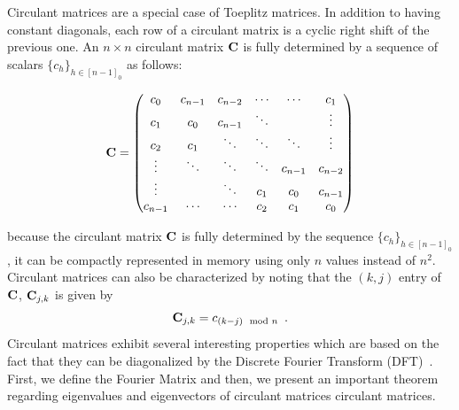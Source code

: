 Circulant matrices are a special case of Toeplitz matrices.
In addition to having constant diagonals, each row of a circulant matrix is a cyclic right shift of the previous one.
An $n \times n$ circulant matrix $\mathbf{C}$ is fully determined by a sequence of scalars $\{c_h\}_{h \in [n-1]_0}$ as follows:

\begin{equation}
  \mathbf{C} =
  \begin{pmatrix}
    c_0 & c_{n-1} & c_{n-2} & \cdots & \cdots & c_{1} \\
    c_{1} & c_0 & c_{n-1} & \ddots & & \vdots \\
    c_{2} & c_{1} & \ddots & \ddots & \ddots & \vdots \\ 
    \vdots & \ddots & \ddots & \ddots & c_{n-1} & c_{n-2} \\
    \vdots & & \ddots & c_{1} & c_{0} & c_{n-1} \\
    c_{n-1} & \cdots & \cdots & c_{2} & c_{1} & c_0
  \end{pmatrix}
\end{equation}

\noindent
because the circulant matrix $\mathbf{C}$ is fully determined by the sequence $\{c_h\}_{h \in [n-1]_0}$, it can be compactly represented in memory using only $n$ values instead of $n^2$.
Circulant matrices can also be characterized by noting that the $(k,j)$ entry of $\mathbf{C}$, $\mathbf{C}_{j,k}$ is given by
\begin{equation}
  \Cmat_{j,k} = c_{\left(k-j\right) \mod n} \enspace.
\end{equation}
Circulant matrices exhibit several interesting properties which are based on the fact that they can be diagonalized by the Discrete Fourier Transform (DFT)~\cite{davis1979circulant}.
First, we define the Fourier Matrix and then, we present an important theorem regarding eigenvalues and eigenvectors of circulant matrices circulant matrices.

